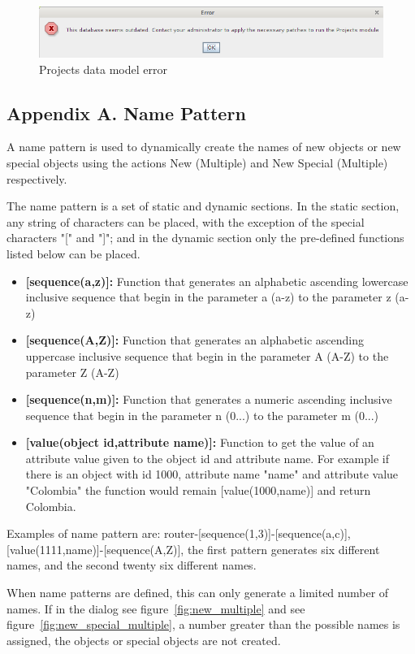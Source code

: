 \documentclass[a4paper]{article}
\begin{document}
		    \begin{figure}[h!]
		    	\centering
		    	\includegraphics[width=0.8\linewidth]{img/patch_projects.png}
		    	\caption{Projects data model error}
		    	\label{fig:patch_projects}
		    \end{figure}
		\newpage
		\begin{appendices}
			\appendix
			\section{Appendix A. Name Pattern} \label{app:AppendixA}
			A name pattern is used to dynamically create the names of new objects or new special objects using the actions New (Multiple) and New Special (Multiple) respectively.			
			
			The name pattern is a set of static and dynamic sections. In the static section, any string of characters can be placed, with the exception of the special characters "[" and "]"; and in the dynamic section only the pre-defined functions listed below can be placed.
			
			\begin{itemize}
				\item \textbf{[sequence(a,z)]:} Function that generates an alphabetic ascending lowercase inclusive sequence that begin in the parameter a (a-z) to the parameter z (a-z)
				\item \textbf{[sequence(A,Z)]:} Function that generates an alphabetic ascending uppercase inclusive sequence that begin in the parameter A (A-Z) to the parameter Z (A-Z)
				\item \textbf{[sequence(n,m)]:} Function that generates a numeric ascending inclusive sequence that begin in the parameter n (0...) to the parameter m (0...)
				\item \textbf{[value(object id,attribute name)]:} Function to get the value of an attribute value given to the object id and attribute name. For example if there is an object with id 1000, attribute name "name" and attribute value "Colombia" the function would remain [value(1000,name)] and return Colombia.
			\end{itemize}
			
			Examples of name pattern are: router-[sequence(1,3)]-[sequence(a,c)], [value(1111,name)]-[sequence(A,Z)], the first pattern generates six different names, and the second twenty six different names.
			
			When name patterns are defined, this can only generate a limited number of names. If in the dialog see figure~\ref{fig:new_multiple} and see figure~\ref{fig:new_special_multiple}, a number greater than the possible names is assigned, the objects or special objects are not created.

						
		\end{appendices}				
\end{document}
